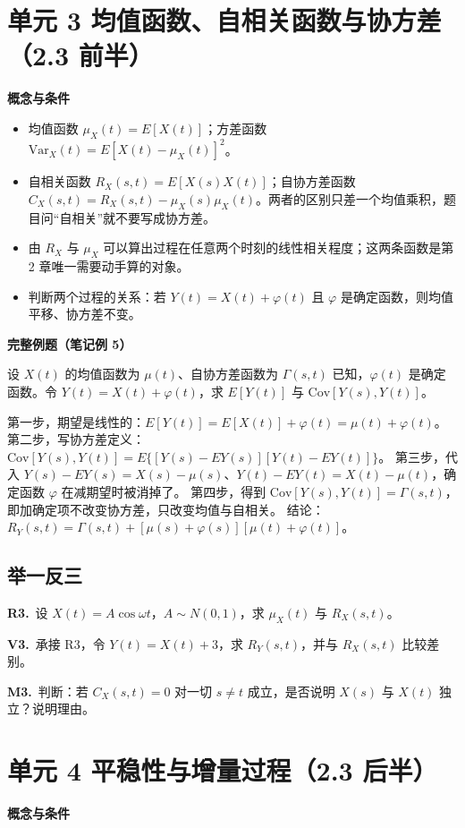 \documentclass[UTF8,a4paper,11pt]{ctexart}
\newcommand{\CompactQuestion}[2]{\par\noindent\textbf{#1.}\ #2\par\vspace{.8em}}
\begin{document}
\section{单元 3 均值函数、自相关函数与协方差（2.3 前半）}
\textbf{概念与条件}

\begin{itemize}
\item 均值函数 $\mu_X(t)=E[X(t)]$；方差函数 $\mathrm{Var}_X(t)=E[X(t)-\mu_X(t)]^2$。
\item 自相关函数 $R_X(s,t)=E[X(s)X(t)]$；自协方差函数 $C_X(s,t)=R_X(s,t)-\mu_X(s)\mu_X(t)$。两者的区别只差一个均值乘积，题目问“自相关”就不要写成协方差。
\item 由 $R_X$ 与 $\mu_X$ 可以算出过程在任意两个时刻的线性相关程度；这两条函数是第 2 章唯一需要动手算的对象。
\item 判断两个过程的关系：若 $Y(t)=X(t)+\varphi(t)$ 且 $\varphi$ 是确定函数，则均值平移、协方差不变。
\end{itemize}
\textbf{完整例题（笔记例 5）}

设 $X(t)$ 的均值函数为 $\mu(t)$、自协方差函数为 $\Gamma(s,t)$ 已知，$\varphi(t)$ 是确定函数。令 $Y(t)=X(t)+\varphi(t)$，求 $E[Y(t)]$ 与 $\mathrm{Cov}[Y(s),Y(t)]$。

第一步，期望是线性的：$E[Y(t)]=E[X(t)]+\varphi(t)=\mu(t)+\varphi(t)$。 第二步，写协方差定义：$\mathrm{Cov}[Y(s),Y(t)]=E\{[Y(s)-E Y(s)][Y(t)-E Y(t)]\}$。 第三步，代入 $Y(s)-E Y(s)=X(s)-\mu(s)$、$Y(t)-E Y(t)=X(t)-\mu(t)$，确定函数 $\varphi$ 在减期望时被消掉了。 第四步，得到 $\mathrm{Cov}[Y(s),Y(t)]=\Gamma(s,t)$，即加确定项不改变协方差，只改变均值与自相关。 结论：$R_Y(s,t)=\Gamma(s,t)+[\mu(s)+\varphi(s)][\mu(t)+\varphi(t)]$。

\subsection{举一反三}
\CompactQuestion{R3}{设 $X(t)=A\cos\omega t$，$A\sim N(0,1)$，求 $\mu_X(t)$ 与 $R_X(s,t)$。}
\CompactQuestion{V3}{承接 R3，令 $Y(t)=X(t)+3$，求 $R_Y(s,t)$，并与 $R_X(s,t)$ 比较差别。}
\CompactQuestion{M3}{判断：若 $C_X(s,t)=0$ 对一切 $s\ne t$ 成立，是否说明 $X(s)$ 与 $X(t)$ 独立？说明理由。}
\clearpage
{}
\section{单元 4 平稳性与增量过程（2.3 后半）}
\textbf{概念与条件}
\end{document}
